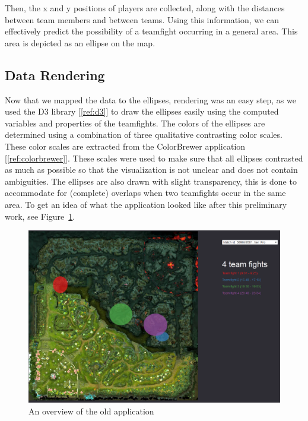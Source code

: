 \documentclass[11pt,twoside,a4paper]{article}
\begin{document}
Then, the x and y positions of players are collected, along with the distances between team members and between teams. Using this information, we can effectively predict the possibility of a teamfight occurring in a general area. This area is depicted as an ellipse on the map. 






\subsection{Data Rendering}
\label{subsec:datarendering}
Now that we mapped the data to the ellipses, rendering was an easy step, as we used the D3 library [\ref{ref:d3}]
 to draw the ellipses easily using the computed variables and properties of the teamfights. The colors of the ellipses are determined using a combination of three qualitative contrasting color scales. These color scales are extracted from the ColorBrewer application [\ref{ref:colorbrewer}].
These scales were used to make sure that all ellipses contrasted as much as possible so that the visualization is not unclear and does not contain ambiguities. 
The ellipses are also drawn with slight transparency, this is done to accommodate for (complete) overlaps when two teamfights occur in the same area.
\newline\newline
To get an idea of what the application looked like after this preliminary work, see Figure~\ref{fig:oldapp}.

\begin{figure}[ht]
\centering
\includegraphics[width=\textwidth]{oldApp.png}
\caption{An overview of the old application}
\label{fig:oldapp}
\end{figure}
\end{document}
